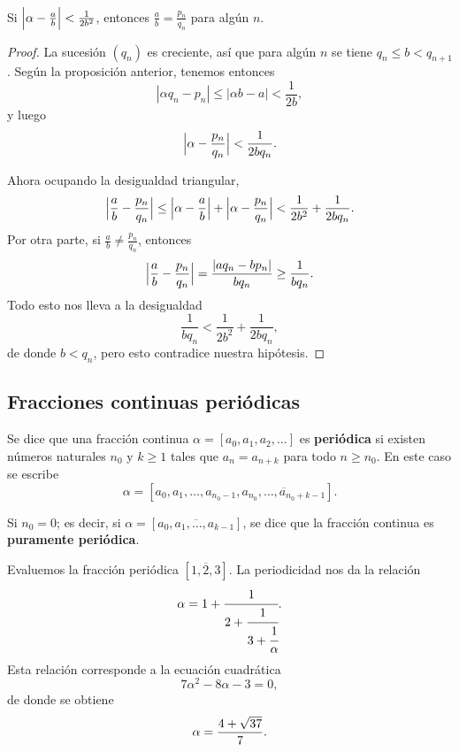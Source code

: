 \begin{corolario}
  Si $\Bigl|\alpha - \frac{a}{b}\Bigr| < \frac{1}{2b^2}$, entonces
  $\frac{a}{b} = \frac{p_n}{q_n}$ para algún $n$.

  \begin{proof}
    La sucesión $(q_n)$ es creciente, así que para algún $n$ se tiene
    $q_n \le b < q_{n+1}$. Según la proposición anterior, tenemos entonces
    $$|\alpha q_n - p_n| \le |\alpha b - a| < \frac{1}{2b},$$
    y luego
    $$\Bigl|\alpha - \frac{p_n}{q_n}\Bigr| < \frac{1}{2b q_n}.$$

    Ahora ocupando la desigualdad triangular,
    \[ \Bigl|\frac{a}{b} - \frac{p_n}{q_n}\Bigr| \le
       \Bigl|\alpha - \frac{a}{b}\Bigr| + \Bigl|\alpha - \frac{p_n}{q_n}\Bigr|
       < \frac{1}{2b^2} + \frac{1}{2b q_n}. \]
    Por otra parte, si $\frac{a}{b} \ne \frac{p_n}{q_n}$, entonces
    \[ \Bigl|\frac{a}{b} - \frac{p_n}{q_n}\Bigr| =
       \frac{|a q_n - b p_n|}{b q_n} \ge \frac{1}{b q_n}. \]
    Todo esto nos lleva a la desigualdad
    $$\frac{1}{b q_n} < \frac{1}{2b^2} + \frac{1}{2b q_n},$$
    de donde $b < q_n$, pero esto contradice nuestra hipótesis.
  \end{proof}
\end{corolario}

\subsection{Fracciones continuas periódicas}

\begin{definicion}
  Se dice que una fracción continua $\alpha = [a_0,a_1,a_2,\ldots]$ es
  \textbf{periódica} si existen números naturales $n_0$ y $k \ge 1$ tales que
  $a_n = a_{n+k}$ para todo $n \ge n_0$. En este caso se escribe
  $$\alpha = [a_0,a_1,\ldots,a_{n_0-1}, \overline{a_{n_0}, \ldots, a_{n_0+k-1}}].$$

  Si $n_0 = 0$; es decir, si $\alpha = [\overline{a_0,a_1,\ldots,a_{k-1}}]$,
  se dice que la fracción continua es \textbf{puramente periódica}.
\end{definicion}

\begin{ejemplo}
  Evaluemos la fracción periódica $[\overline{1,2,3}]$. La periodicidad nos da
  la relación
  $$\alpha = 1 + \cfrac{1}{2 + \cfrac{1}{3 + \cfrac{1}{\alpha}}}.$$
  Esta relación corresponde a la ecuación cuadrática
  $$7 \alpha^2 - 8\alpha - 3 = 0,$$
  de donde se obtiene
  \[ \alpha = \frac{4 + \sqrt{37}}{7}. \qedhere \]
\end{ejemplo}

